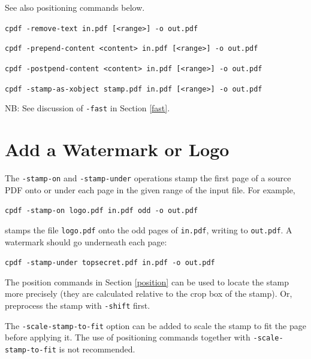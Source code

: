 \documentclass{book}
\begin{document}
\begin{framed}
  \vspace{1.5mm}
  \noindent See also positioning commands below.

  \vspace{1.5mm}
  \noindent\small\verb!cpdf -remove-text in.pdf [<range>] -o out.pdf!

  \vspace{1.5mm}
  \noindent\small\verb!cpdf -prepend-content <content> in.pdf [<range>] -o out.pdf!

  \vspace{1.5mm}
  \noindent\small\verb!cpdf -postpend-content <content> in.pdf [<range>] -o out.pdf!

  \vspace{1.5mm}
  \noindent\small\verb!cpdf -stamp-as-xobject stamp.pdf in.pdf [<range>] -o out.pdf!

  \vspace{1.5mm}
  \noindent\small NB: See discussion of \texttt{-fast} in Section \ref{fast}.
  \end{framed}

  \section{Add a Watermark or Logo}
  The \texttt{-stamp-on} and \texttt{-stamp-under} operations stamp the first
page of a source PDF onto or under each page in the given range of the input
file. For example,

  \begin{framed}
    \noindent\small\verb!cpdf -stamp-on logo.pdf in.pdf odd -o out.pdf!
  \end{framed}

\noindent stamps the file \texttt{logo.pdf} onto the odd pages of \texttt{in.pdf},
writing to \texttt{out.pdf}. A watermark should go underneath each page:

  \begin{framed}
    \noindent\small\verb!cpdf -stamp-under topsecret.pdf in.pdf -o out.pdf!
  \end{framed}

\noindent The position commands in Section \ref{position} can be used to locate the stamp more precisely (they are calculated relative to the crop box of the stamp). Or, preprocess the stamp with \texttt{-shift} first.

The \texttt{-scale-stamp-to-fit} option can be added to scale the stamp to fit the page before applying it. The use of positioning commands together with \texttt{-scale-stamp-to-fit} is not recommended.
\end{document}
